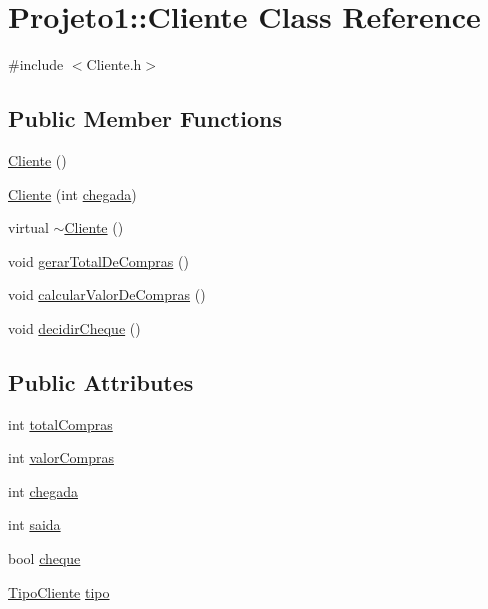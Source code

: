 \hypertarget{classProjeto1_1_1Cliente}{
\section{Projeto1::Cliente Class Reference}
\label{classProjeto1_1_1Cliente}
}


{\ttfamily \#include $<$Cliente.h$>$}

\subsection*{Public Member Functions}
\begin{DoxyCompactItemize}
\item 
\hyperlink{classProjeto1_1_1Cliente_a6ae1c10cc466395103a86c7c8a264038}{Cliente} ()
\item 
\hyperlink{classProjeto1_1_1Cliente_a2753ad34ef32991f3ea25585d8a1fa8a}{Cliente} (int \hyperlink{classProjeto1_1_1Cliente_adc19105b9deaa9411028a32ba1eec9fc}{chegada})
\item 
virtual \hyperlink{classProjeto1_1_1Cliente_ac90c4ac14257d2714468bedc178a13ee}{$\sim$Cliente} ()
\item 
void \hyperlink{classProjeto1_1_1Cliente_af92320dc3f60493254a12d4295c842db}{gerarTotalDeCompras} ()
\item 
void \hyperlink{classProjeto1_1_1Cliente_a6507e848da3d68d859663be187094efc}{calcularValorDeCompras} ()
\item 
void \hyperlink{classProjeto1_1_1Cliente_a38c487a5b371ddef86d2b649b7f30872}{decidirCheque} ()
\end{DoxyCompactItemize}
\subsection*{Public Attributes}
\begin{DoxyCompactItemize}
\item 
int \hyperlink{classProjeto1_1_1Cliente_ae6670b6e5ba64ee23f9798845df586a5}{totalCompras}
\item 
int \hyperlink{classProjeto1_1_1Cliente_a37b32637d513c756c817415f618d8d9d}{valorCompras}
\item 
int \hyperlink{classProjeto1_1_1Cliente_adc19105b9deaa9411028a32ba1eec9fc}{chegada}
\item 
int \hyperlink{classProjeto1_1_1Cliente_a868b7d7e3b824aed35511c433801824a}{saida}
\item 
bool \hyperlink{classProjeto1_1_1Cliente_ad54c6376c859c8cdb68887b3948e9841}{cheque}
\item 
\hyperlink{namespaceProjeto1_a4dade362b39c779d6411abf4ba19aeed}{TipoCliente} \hyperlink{classProjeto1_1_1Cliente_af37da5fe48856223d53932cf61d4b3f7}{tipo}
\end{DoxyCompactItemize}


